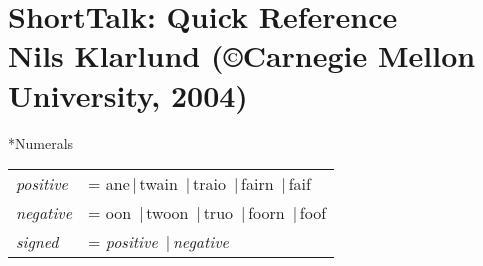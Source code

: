 \documentclass[twocolumn,10pt]{article}
\makeatletter
\renewcommand{\subsection}{\@startsection
  {subsection}{2}{0mm}{-.1\baselineskip}{-.1\baselineskip}%
  {\normalfont\bfseries}}
\newcommand{\vbar}{$\,|\,$}
\newcommand{\cmd}{\sffamily\upshape}
\newcommand{\cat}[1]{\textrm{\textit{#1}}}
\newenvironment{mycenter}
{\begin{trivlist}\item \begin{footnotesize}}
{\end{footnotesize}\end{trivlist}}
\makeatother
\begin{document}
\section*{ShortTalk: Quick Reference\\
\normalsize{Nils Klarlund (\copyright Carnegie Mellon University, 2004)}}


\subsection*{Numerals}
\begin{mycenter}
\begin{tabular}{ll}
\cat{positive}   &= \cmd ane\vbar twain \vbar traio \vbar fairn \vbar faif\\
\cat{negative}   &=  \cmd oon \vbar twoon \vbar truo \vbar foorn \vbar foof\\
\cat{signed}     &=    \cmd \cat{positive} \vbar \cat{negative}\\
\end{tabular}
\end{mycenter} 
\end{document}
